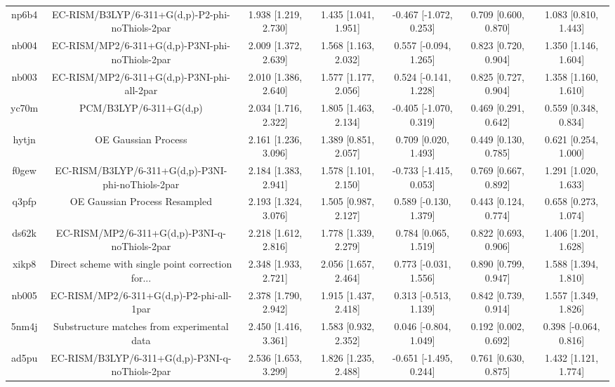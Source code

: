 \documentclass{article}
\begin{document}
\begin{center}
\begin{longtable}{|ccccccc|}
 np6b4 &    EC-RISM/B3LYP/6-311+G(d,p)-P2-phi-noThiols-2par &  1.938 [1.219, 2.730] &  1.435 [1.041, 1.951] &   -0.467 [-1.072, 0.253] &  0.709 [0.600, 0.870] &   1.083 [0.810, 1.443] \\
 nb004 &    EC-RISM/MP2/6-311+G(d,p)-P3NI-phi-noThiols-2par &  2.009 [1.372, 2.639] &  1.568 [1.163, 2.032] &    0.557 [-0.094, 1.265] &  0.823 [0.720, 0.904] &   1.350 [1.146, 1.604] \\
 nb003 &         EC-RISM/MP2/6-311+G(d,p)-P3NI-phi-all-2par &  2.010 [1.386, 2.640] &  1.577 [1.177, 2.056] &    0.524 [-0.141, 1.228] &  0.825 [0.727, 0.904] &   1.358 [1.160, 1.610] \\
 yc70m &                             PCM/B3LYP/6-311+G(d,p) &  2.034 [1.716, 2.322] &  1.805 [1.463, 2.134] &   -0.405 [-1.070, 0.319] &  0.469 [0.291, 0.642] &   0.559 [0.348, 0.834] \\
 hytjn &                                OE Gaussian Process &  2.161 [1.236, 3.096] &  1.389 [0.851, 2.057] &     0.709 [0.020, 1.493] &  0.449 [0.130, 0.785] &   0.621 [0.254, 1.000] \\
 f0gew &  EC-RISM/B3LYP/6-311+G(d,p)-P3NI-phi-noThiols-2par &  2.184 [1.383, 2.941] &  1.578 [1.101, 2.150] &   -0.733 [-1.415, 0.053] &  0.769 [0.667, 0.892] &   1.291 [1.020, 1.633] \\
 q3pfp &                      OE Gaussian Process Resampled &  2.193 [1.324, 3.076] &  1.505 [0.987, 2.127] &    0.589 [-0.130, 1.379] &  0.443 [0.124, 0.774] &   0.658 [0.273, 1.074] \\
 ds62k &      EC-RISM/MP2/6-311+G(d,p)-P3NI-q-noThiols-2par &  2.218 [1.612, 2.816] &  1.778 [1.339, 2.279] &     0.784 [0.065, 1.519] &  0.822 [0.693, 0.906] &   1.406 [1.201, 1.628] \\
 xikp8 &  Direct scheme with single point correction for... &  2.348 [1.933, 2.721] &  2.056 [1.657, 2.464] &    0.773 [-0.031, 1.556] &  0.890 [0.799, 0.947] &   1.588 [1.394, 1.810] \\
 nb005 &           EC-RISM/MP2/6-311+G(d,p)-P2-phi-all-1par &  2.378 [1.790, 2.942] &  1.915 [1.437, 2.418] &    0.313 [-0.513, 1.139] &  0.842 [0.739, 0.914] &   1.557 [1.349, 1.826] \\
 5nm4j &        Substructure matches from experimental data &  2.450 [1.416, 3.361] &  1.583 [0.932, 2.352] &    0.046 [-0.804, 1.049] &  0.192 [0.002, 0.692] &  0.398 [-0.064, 0.816] \\
 ad5pu &    EC-RISM/B3LYP/6-311+G(d,p)-P3NI-q-noThiols-2par &  2.536 [1.653, 3.299] &  1.826 [1.235, 2.488] &   -0.651 [-1.495, 0.244] &  0.761 [0.630, 0.875] &   1.432 [1.121, 1.774] \\

\end{longtable}
\end{center}
\end{document}
